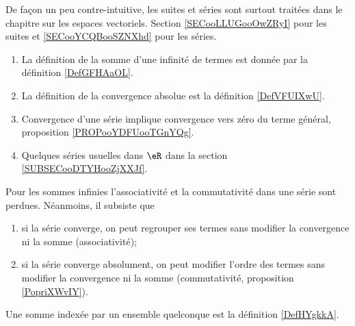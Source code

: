 
De façon un peu contre-intuitive, les suites et séries sont surtout traitées dans le chapitre sur les espaces vectoriels. Section \ref{SECooLLUGooOwZRyI} pour les suites et \ref{SECooYCQBooSZNXhd} pour les séries.

\begin{enumerate}
    \item
        La définition de la somme d'une infinité de termes est donnée par la définition \ref{DefGFHAaOL}.
    \item
        La définition de la convergence absolue est la définition \ref{DefVFUIXwU}.
    \item
        Convergence d'une série implique convergence vers zéro du terme général, proposition \ref{PROPooYDFUooTGnYQg}.
    \item
        Quelques séries usuelles dans \( \eR\) dans la section \ref{SUBSECooDTYHooZjXXJf}.
\end{enumerate}

    Pour les sommes infinies l'associativité et la commutativité dans une série sont perdues. Néanmoins, il subsiste que
  \begin{enumerate}
  \item 
      si la série converge, on peut regrouper ses termes sans modifier la convergence ni la somme (associativité);
  \item
      si la série converge absolument, on peut modifier l'ordre des termes sans modifier la convergence ni la somme (commutativité, proposition \ref{PopriXWvIY}).
  \end{enumerate}

Une somme indexée par un ensemble quelconque est la définition \ref{DefHYgkkA}.

